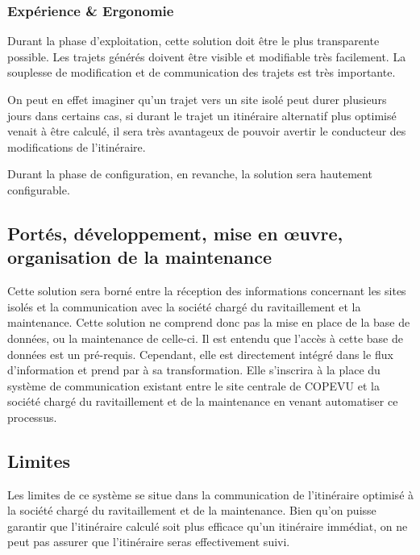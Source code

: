         \subsubsection{Expérience \& Ergonomie}
        
            Durant la phase d'exploitation, cette solution doit être le plus transparente possible.
            Les trajets générés doivent être visible et modifiable très facilement.
            La souplesse de modification et de communication des trajets est très importante.
            
            On peut en effet imaginer qu'un trajet vers un site isolé peut durer plusieurs jours dans certains cas, si durant le trajet un itinéraire alternatif plus optimisé venait à être calculé, il sera très avantageux de pouvoir avertir le conducteur des modifications de l'itinéraire.
            
            Durant la phase de configuration, en revanche, la solution sera hautement configurable.
        
    \subsection{Portés, développement, mise en œuvre, organisation de la maintenance}
        
            Cette solution sera borné entre la réception des informations concernant les sites isolés et la communication avec la société chargé du ravitaillement et la maintenance.
            Cette solution ne comprend donc pas la mise en place de la base de données, ou la maintenance de celle-ci. Il est entendu que l'accès à cette base de données est un pré-requis.
            Cependant, elle est directement intégré dans le flux d'information et prend par à sa transformation.
            Elle s'inscrira à la place du système de communication existant entre le site centrale de COPEVU et la société chargé du ravitaillement et de la maintenance en venant automatiser ce processus.
    
    \subsection{Limites}
    
        Les limites de ce système se situe dans la communication de l'itinéraire optimisé à la société chargé du ravitaillement et de la maintenance. Bien qu'on puisse garantir que l'itinéraire calculé soit plus efficace qu'un itinéraire immédiat, on ne peut pas assurer que l'itinéraire seras effectivement suivi.

